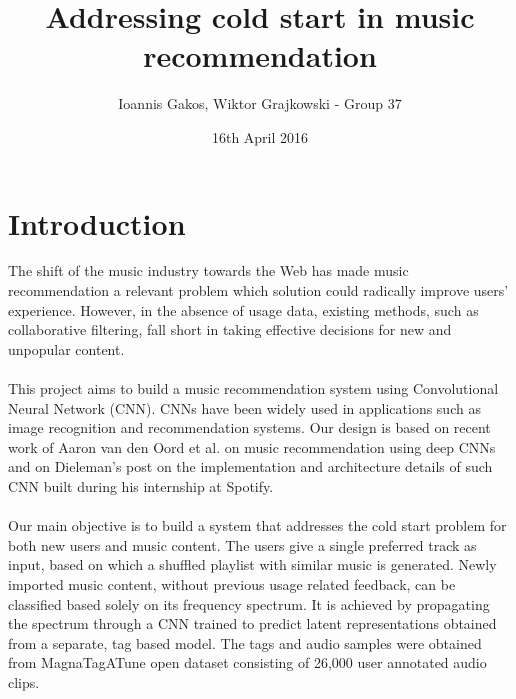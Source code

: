 \documentclass[11pt, a4paper]{article}
\begin{document}
  \title{Addressing cold start in music recommendation}
  \author{Ioannis Gakos, Wiktor Grajkowski - Group 37}
  \date{16th April 2016}
  \maketitle

  \section{Introduction}
    The shift of the music industry towards the Web has made music
    recommendation a relevant problem which solution could radically improve
    users' experience. However, in the absence of usage data, existing methods,
    such as collaborative filtering, fall short in taking effective decisions
    for new and unpopular content.
    \\ \\
    \noindent
    This project aims to build a music recommendation system using
    Convolutional Neural Network (CNN). CNNs have been widely used in
    applications such as image recognition and recommendation systems. Our
    design is based on recent work of Aaron van den Oord et al. on music
    recommendation \cite{deep-content-based-music-recommendation} using deep
    CNNs and on Dieleman's post \cite{spotify-dieleman} on the implementation
    and architecture details of such CNN built during his internship at
    Spotify.
    \\ \\
    \noindent
    Our main objective is to build a system that addresses the cold start
    problem for both new users and music content. The users give a single
    preferred track as input, based on which a shuffled playlist with similar
    music is generated. Newly imported music content, without previous usage
    related feedback, can be classified based solely on its frequency spectrum.
    It is achieved by propagating the spectrum through a CNN trained to predict
    latent representations obtained from a separate, tag based model. The tags
    and audio samples were obtained from MagnaTagATune open dataset consisting
    of 26,000 user annotated audio clips.
\end{document}
